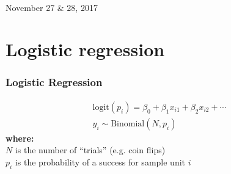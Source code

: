 \documentclass[color=usenames,dvipsnames]{beamer}\usepackage[]{graphicx}\usepackage[]{color}
\begin{document}
\setlength\fboxsep{0pt}




\begin{frame}[plain]
  \huge
  \centering \par
  {\color{RoyalBlue}{Lab 13 -- Generalized Linear Models}} \\
  \vspace{1cm}
  \LARGE
  November 27 \& 28, 2017
\end{frame}





\section{Logistic regression}


\begin{frame}
  \frametitle{Logistic Regression}
  \large
    \begin{gather*}
      \mathrm{logit}(p_i) = \beta_0 + \beta_1 x_{i1} + \beta_2 x_{i2} + \cdots \\
      y_i \sim \mathrm{Binomial}(N, p_i)
  \end{gather*}
  \pause
  {\bf where: \\}
  $N$ is the number of ``trials'' (e.g. coin flips) \\
  $p_i$ is the probability of a success for sample unit $i$
\end{frame}
\end{document}
